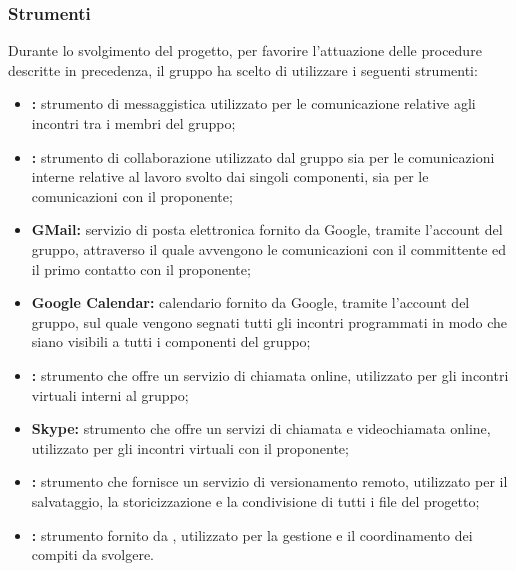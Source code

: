 	\subsubsection{Strumenti}

		Durante lo svolgimento del progetto, per favorire l'attuazione delle procedure descritte in precedenza, il gruppo ha scelto di utilizzare i seguenti strumenti:
		\begin{itemize}
			\item \textbf{:} strumento di messaggistica utilizzato per le comunicazione relative agli incontri tra i membri del gruppo;
			\item \textbf{:} strumento di collaborazione utilizzato dal gruppo sia per le comunicazioni interne relative al lavoro svolto dai singoli componenti, sia per le comunicazioni con il proponente;
			\item \textbf{GMail:} servizio di posta elettronica fornito da Google, tramite l'account del gruppo, attraverso il quale avvengono le comunicazioni con il committente ed il primo contatto con il proponente;
			\item \textbf{Google Calendar:} calendario fornito da Google, tramite l'account del gruppo, sul quale vengono segnati tutti gli incontri programmati in modo che siano visibili a tutti i componenti del gruppo;
			\item \textbf{:} strumento che offre un servizio di chiamata online, utilizzato per gli incontri virtuali interni al gruppo;
			\item \textbf{Skype:} strumento che offre un servizi di chiamata e videochiamata online, utilizzato per gli incontri virtuali con il proponente;
			\item \textbf{:} strumento che fornisce un servizio di versionamento remoto, utilizzato per il salvataggio, la storicizzazione e la condivisione di tutti i file del progetto;
			\item \textbf{:} strumento fornito da , utilizzato per la gestione e il coordinamento dei compiti da svolgere.
		\end{itemize}


